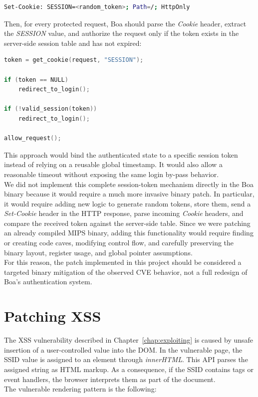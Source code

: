 \begin{lstlisting}[language=bash]
Set-Cookie: SESSION=<random_token>; Path=/; HttpOnly
\end{lstlisting}

  Then, for every protected request, Boa should parse the \emph{Cookie} header, extract the \emph{SESSION} value, and authorize the request only if the token exists in the server-side session table and has not expired:

\begin{lstlisting}[language=C]
token = get_cookie(request, "SESSION");

if (token == NULL)
    redirect_to_login();

if (!valid_session(token))
    redirect_to_login();

allow_request();
\end{lstlisting}

  This approach would bind the authenticated state to a specific session token instead of relying on a reusable global timestamp. It would also allow a reasonable timeout without exposing the same login by-pass behavior.
\\
  We did not implement this complete session-token mechanism directly in the Boa binary because it would require a much more invasive binary patch. In particular, it would require adding new logic to generate random tokens, store them, send a \emph{Set-Cookie} header in the HTTP response, parse incoming \emph{Cookie} headers, and compare the received token against the server-side table. Since we were patching an already compiled MIPS binary, adding this functionality would require finding or creating code caves, modifying control flow, and carefully preserving the binary layout, register usage, and global pointer assumptions.
\\
  For this reason, the patch implemented in this project should be considered a targeted binary mitigation of the observed CVE behavior, not a full redesign of Boa's authentication system.

    \section{Patching XSS}

          The XSS vulnerability described in Chapter~\ref{chap:exploiting} is caused by unsafe insertion of a user-controlled value into the DOM. In the vulnerable page, the SSID value is assigned to an element through \emph{innerHTML}. This API parses the assigned string as HTML markup. As a consequence, if the SSID contains tags or event handlers, the browser interprets them as part of the document.
\\
          The vulnerable rendering pattern is the following:

